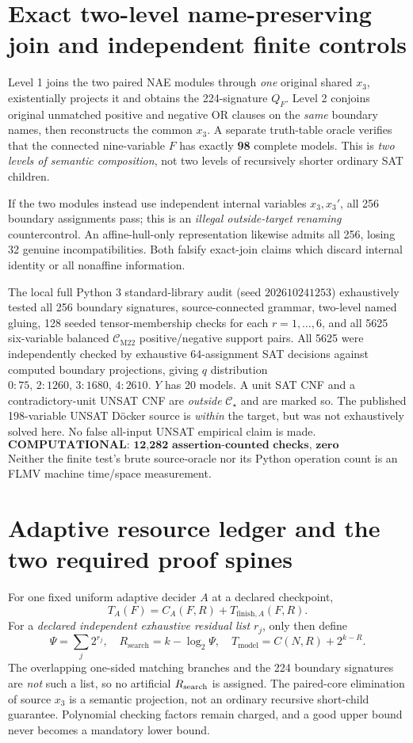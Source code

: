 \documentclass[11pt]{article}
\newcommand{\CM}{\mathcal C_{\mathrm{M22}}}
\newcommand{\CS}{\mathcal C_{\star}}
\begin{document}
\section{Exact two-level name-preserving join and independent finite controls}
Level 1 joins the two paired NAE modules through \emph{one} original shared $x_3$, existentially projects it and obtains the 224-signature $Q_F$. Level 2 conjoins original unmatched positive and negative OR clauses on the \emph{same} boundary names, then reconstructs the common $x_3$. A separate truth-table oracle verifies that the connected nine-variable $F$ has exactly \textbf{98} complete models. This is \emph{two levels of semantic composition}, not two levels of recursively shorter ordinary SAT children.

If the two modules instead use independent internal variables $x_3,x_3'$, all 256 boundary assignments pass; this is an \emph{illegal outside-target renaming} countercontrol. An affine-hull-only representation likewise admits all 256, losing 32 genuine incompatibilities. Both falsify exact-join claims which discard internal identity or all nonaffine information.

The local full Python 3 standard-library audit (seed $202610241253$) exhaustively tested all 256 boundary signatures, source-connected grammar, two-level named gluing, 128 seeded tensor-membership checks for each $r=1,\dots,6$, and all 5625 six-variable balanced $\CM$ positive/negative support pairs. All 5625 were independently checked by exhaustive 64-assignment SAT decisions against computed boundary projections, giving $q$ distribution $0:75,\,2:1260,\,3:1680,\,4:2610$. $Y$ has 20 models. A unit SAT CNF and a contradictory-unit UNSAT CNF are \emph{outside} $\CS$ and are marked so. The published 198-variable UNSAT D\"ocker source is \emph{within} the target, but was not exhaustively solved here. No false all-input UNSAT empirical claim is made.
\[
\textbf{COMPUTATIONAL: 12,282 assertion-counted checks, zero discrepancies, two byte-identical result runs.}
\]
Neither the finite test's brute source-oracle nor its Python operation count is an FLMV machine time/space measurement.

\section{Adaptive resource ledger and the two required proof spines}
For one fixed uniform adaptive decider $A$ at a declared checkpoint,
\[
T_A(F)=C_A(F,R)+T_{\mathrm{finish},A}(F,R).
\]
For a \emph{declared independent exhaustive residual list} $r_j$, only then define
\[
\Psi=\sum_j2^{r_j},\quad R_{\mathrm{search}}=k-\log_2\Psi,\quad
T_{\mathrm{model}}=C(N,R)+2^{k-R}.
\]
The overlapping one-sided matching branches and the 224 boundary signatures are \emph{not} such a list, so no artificial $R_{\rm search}$ is assigned. The paired-core elimination of source $x_3$ is a semantic projection, not an ordinary recursive short-child guarantee. Polynomial checking factors remain charged, and a good upper bound never becomes a mandatory lower bound.
\end{document}
